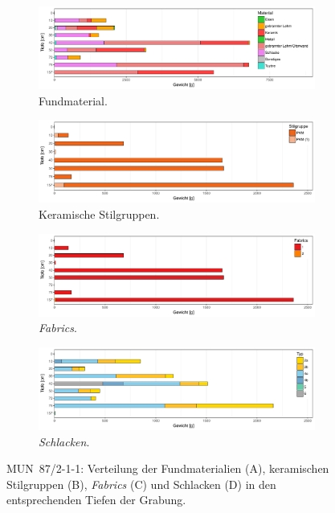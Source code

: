 \begin{figure}[p]
	\centering
	\begin{subfigure}{\textwidth}	
		\centering
		\includegraphics[width = \textwidth]{fig/9-16_MUN87-211_VerteilungFunde_R.pdf}
		\caption{Fundmaterial.\vspace{1em}}	
		\label{fig:MUN87-211_VerteilungFunde}
	\end{subfigure}
	\begin{subfigure}{\textwidth}
		\centering
		\includegraphics[width = \textwidth]{fig/9-16_MUN87-211_KeramikStilgruppen_R.pdf}
		\caption{Keramische Stilgruppen.\vspace{1em}}
		\label{fig:MUN87-211_VerteilungStilgr}
	\end{subfigure}
	\begin{subfigure}{\textwidth}	
		\centering
		\includegraphics[width = \textwidth]{fig/9-16_MUN87-211_Fabrics_R.pdf}
		\caption{\textit{Fabrics}.\vspace{1em}}
		\label{fig:MUN87-211_VerteilungFabrics}
	\end{subfigure}
	\begin{subfigure}{\textwidth}	
		\centering
		\includegraphics[width = \textwidth]{fig/9-16_MUN87-211_Schlacken_R.pdf}
		\caption{\textit{Schlacken}.}
		\label{fig:MUN87-211_Schlacken}
	\end{subfigure}
	\caption{MUN~87/2-1-1: Verteilung der Fundmaterialien (A), keramischen Stilgruppen (B), \textit{Fabrics} (C) und Schlacken (D) in den entsprechenden Tiefen der Grabung.}
	\label{fig:MUN87-211_Funde}
\end{figure}

